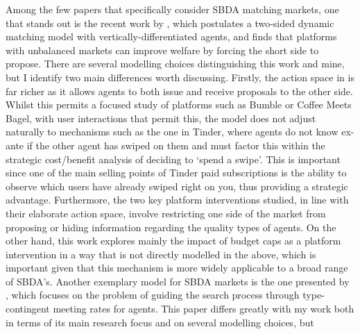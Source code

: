 Among the few papers that specifically consider SBDA matching markets, one that stands out is the recent work by \cite{kanoria2021facilitating}, which postulates a two-sided dynamic matching model with vertically-differentiated agents, and finds that platforms with unbalanced markets can improve welfare by forcing the short side to propose. There are several modelling choices distinguishing this work and mine, but I identify two main differences worth discussing. Firstly, the action space in \cite{kanoria2021facilitating} is far richer as it allows agents to both issue and receive proposals to the other side. Whilst this permits a focused study of platforms such as Bumble or Coffee Meets Bagel, with user interactions that permit this, the model does not adjust naturally to mechanisms such as the one in Tinder, where agents do not know ex-ante if the other agent has swiped on them and must factor this within the strategic cost/benefit analysis of deciding to `spend a swipe'. This is important since one of the main selling points of Tinder paid subscriptions is the ability to observe which users have already swiped right on you, thus providing a strategic advantage. Furthermore, the two key platform interventions studied, in line with their elaborate action space, involve restricting one side of the market from proposing or hiding information regarding the quality types of agents. On the other hand, this work explores mainly the impact of budget caps as a platform intervention in a way that is not directly modelled in the above, which is important given that this mechanism is more widely applicable to a broad range of SBDA's. Another exemplary model for SBDA markets is the one presented by \cite{immorlica2021designing}, which focuses on the problem of guiding the search process through type-contingent meeting rates for agents. This paper differs greatly with my work both in terms of its main research focus and on several modelling choices, but 


